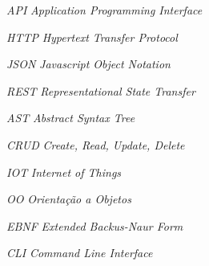 


\begin{siglas}
    \item[\textit{API}] \textit{Application Programming Interface}
    \item[\textit{HTTP}] \textit{Hypertext Transfer Protocol}
    \item[\textit{JSON}] \textit{Javascript Object Notation}
    \item[\textit{REST}] \textit{Representational State Transfer}
    \item[\textit{AST}] \textit{Abstract Syntax Tree}
    \item[\textit{CRUD}] \textit{Create, Read, Update, Delete}
    \item[\textit{IOT}] \textit{Internet of Things}
    \item[\textit{OO}] \textit{Orientação a Objetos}
    \item[\textit{EBNF}] \textit{Extended Backus-Naur Form}
    \item[\textit{CLI}] \textit{Command Line Interface}
\end{siglas}

